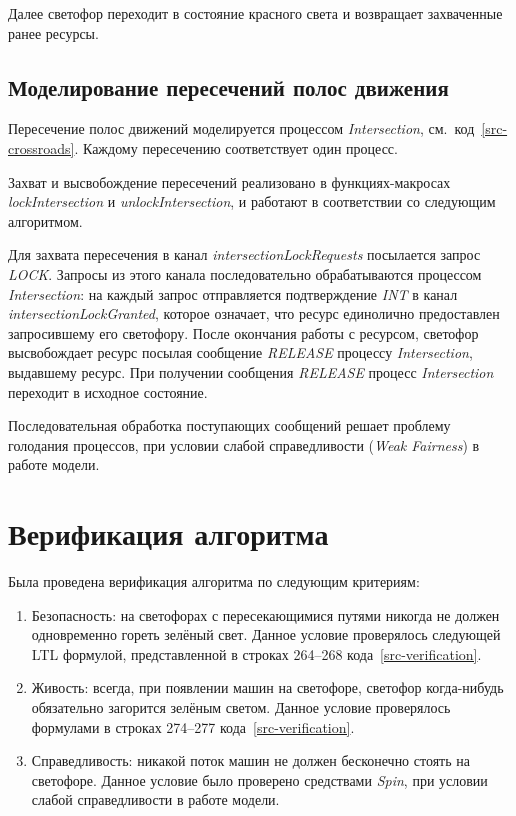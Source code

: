 \documentclass[a4paper,10pt]{article}
\begin{document}
Далее светофор переходит в состояние красного света и возвращает захваченные ранее ресурсы.



\subsection{Моделирование пересечений полос движения}
Пересечение полос движений моделируется процессом \textit{Intersection}, 
см.~код~\ref{src-crossroads}. 
Каждому пересечению соответствует один процесс.

Захват и высвобождение пересечений реализовано в функциях-макросах \textit{lockIntersection} и 
\textit{unlockIntersection}, и работают в соответствии со следующим алгоритмом.

Для захвата пересечения в канал \textit{intersectionLockRequests} посылается запрос \textit{LOCK}.
Запросы из этого канала последовательно обрабатываются процессом \textit{Intersection}:
на каждый запрос отправляется подтверждение \textit{INT} в канал \textit{intersectionLockGranted}, 
которое означает, что ресурс единолично предоставлен запросившему его светофору.
После окончания работы с ресурсом, светофор высвобождает ресурс посылая сообщение \textit{RELEASE}
процессу \textit{Intersection}, выдавшему ресурс.
При получении сообщения \textit{RELEASE} процесс \textit{Intersection} переходит в исходное состояние.

Последовательная обработка поступающих сообщений решает проблему голодания процессов, 
при условии слабой справедливости (\textit{Weak Fairness}) в работе модели.



\section{Верификация алгоритма}

Была проведена верификация алгоритма по следующим критериям:
\begin{enumerate}
  \item Безопасность: на светофорах с пересекающимися путями никогда не должен одновременно гореть зелёный свет.
  Данное условие проверялось следующей LTL формулой, представленной в строках 264--268 кода~\ref{src-verification}.
  \item Живость: всегда, при появлении машин на светофоре, 
  светофор когда-нибудь обязательно загорится зелёным светом.
  Данное условие проверялось формулами в строках 274--277 кода~\ref{src-verification}.
  \item Справедливость: никакой поток машин не должен бесконечно стоять на светофоре.
  Данное условие было проверено средствами \textit{Spin}, при условии слабой справедливости в работе модели.
\end{enumerate}
\end{document}
